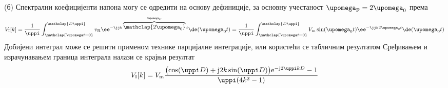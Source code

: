(б) Спектрални коефицијенти напона могу се одредити на основу дефиниције, за основну учестаност 
$\upomega_{\rm F} = 2\upomega_0$ према 
\begin{equation}
    V_{\rm I}[k] = \dfrac{1}{\uppi} \int_{\mathclap{\upomega t = 0}}^{\mathclap{D\uppi}} v_{\rm R} \ee^{-\jj k \overbrace{\mathclap{2\upomega_{\rm 0}}}^{\upomega_{\rm F}} t} \de(\upomega_0 t) 
    = \dfrac{1}{\uppi} \int_{\mathclap{\upomega t = 0}}^{\mathclap{D\uppi}} V_{\rm m} \sin(\upomega_0 t) \ee^{-\jj k {2\upomega_{\rm 0} } t} \de(\upomega_0 t) 
\end{equation}
Добијени интеграл може се решити применом технике парцијалне интеграције, или користећи се табличним резултатом 
Сређивањем и израчунавањем граница интеграла
налази се крајњи резултат
\begin{equation}
V_{\rm I}[k] = {V_{\rm m}}
\dfrac{
\bigl(
\cos(\uppi D) + 
{\rm j}2k \sin(\uppi D) 
\bigr)
{\rm e}^{-{\rm j}2\uppi kD }
-1 }{\uppi(4k^2 - 1)}
\end{equation}





